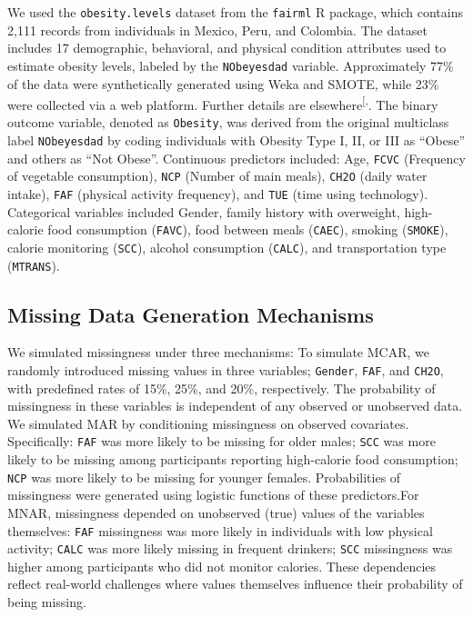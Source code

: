 \documentclass[
  letterpaper,
  DIV=11,
  numbers=noendperiod]{scrartcl}
\begin{document}
We used the \texttt{obesity.levels} dataset from the \texttt{fairml} R
package, which contains 2,111 records from individuals in Mexico, Peru,
and Colombia. The dataset includes 17 demographic, behavioral, and
physical condition attributes used to estimate obesity levels, labeled
by the \texttt{NObeyesdad} variable. Approximately 77\% of the data were
synthetically generated using Weka and SMOTE, while 23\% were collected
via a web platform. Further details are
elsewhere\textsuperscript{{[},\citeproc{ref-de2019obesity}{14}{]}}.
The binary outcome variable, denoted as \texttt{Obesity}, was derived
from the original multiclass label \texttt{NObeyesdad} by coding
individuals with Obesity Type I, II, or III as ``Obese'' and others as
``Not Obese''. Continuous predictors included: Age, \texttt{FCVC}
(Frequency of vegetable consumption), \texttt{NCP} (Number of main
meals), \texttt{CH2O} (daily water intake), \texttt{FAF} (physical
activity frequency), and \texttt{TUE} (time using technology).
Categorical variables included Gender, family history with overweight,
high-calorie food consumption (\texttt{FAVC}), food between meals
(\texttt{CAEC}), smoking (\texttt{SMOKE}), calorie monitoring
(\texttt{SCC}), alcohol consumption (\texttt{CALC}), and transportation
type (\texttt{MTRANS}).

\subsection{Missing Data Generation
Mechanisms}\label{missing-data-generation-mechanisms}

We simulated missingness under three mechanisms: To simulate MCAR, we
randomly introduced missing values in three variables; \texttt{Gender},
\texttt{FAF}, and \texttt{CH2O}, with predefined rates of 15\%, 25\%,
and 20\%, respectively. The probability of missingness in these
variables is independent of any observed or unobserved data. We
simulated MAR by conditioning missingness on observed covariates.
Specifically: \texttt{FAF} was more likely to be missing for older
males; \texttt{SCC} was more likely to be missing among participants
reporting high-calorie food consumption; \texttt{NCP} was more likely to
be missing for younger females. Probabilities of missingness were
generated using logistic functions of these predictors.For MNAR,
missingness depended on unobserved (true) values of the variables
themselves: \texttt{FAF} missingness was more likely in individuals with
low physical activity; \texttt{CALC} was more likely missing in frequent
drinkers; \texttt{SCC} missingness was higher among participants who did
not monitor calories. These dependencies reflect real-world challenges
where values themselves influence their probability of being missing.
\end{document}
